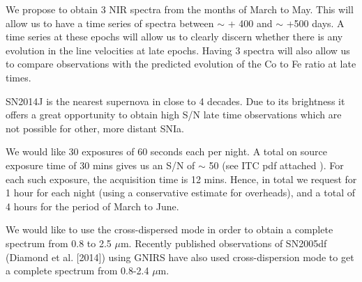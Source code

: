 \documentclass[11pt]{article}
\begin{document}

%

\expdesign    %

We propose to obtain 3 NIR spectra from the months of March to May. This will allow us to have  a time series of spectra between $\sim$ + 400 and $\sim$ +500 days. A time series at these epochs will allow us to clearly discern whether there is any evolution in the line velocities at late epochs. 
Having 3 spectra will also allow us to compare observations with the predicted evolution of the Co to Fe ratio at late times. 

SN2014J is the nearest supernova in close to 4 decades. Due to its brightness it offers a great opportunity to obtain high S/N late time observations which are not possible for other, more distant SNIa.


%

\technicaldescription    %
We would like 30 exposures of 60 seconds  each per night. A total on source exposure time of 30 mins gives us an S/N of $\sim$ 50 (see ITC pdf attached ). For each such exposure, the acquisition time is 12 mins. 
Hence, in total we request for 1 hour for each night (using a conservative estimate for overheads), and a total of 4 hours for the period of March to June. 

We would like to use the cross-dispersed mode in order to obtain a complete spectrum from 0.8 to 2.5 $\mu$m. Recently published observations of SN2005df (Diamond et al. [2014]) using GNIRS have also used cross-dispersion mode to get a complete spectrum from 0.8-2.4 $\mu$m.
\end{document}
